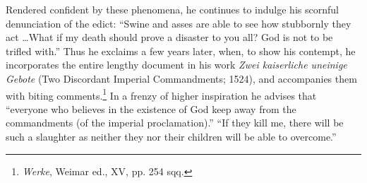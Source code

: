 Rendered confident by these phenomena, he continues to indulge
his scornful denunciation of the edict: “Swine and asses are able to
see how stubbornly they act \dots What if my death should prove
a disaster to you all? God is not to be trifled with.” Thus he exclaims
a few years later, when, to show his contempt, he incorporates the
entire lengthy document in his work \textit{Zwei kaiserliche uneinige Gebote}
(Two Discordant Imperial Commandments; 1524), and accompanies
them with biting comments.\footnote{\textit{Werke}, Weimar ed., XV, pp. 254 sqq.}
In a frenzy of higher inspiration he
advises that “everyone who believes in the existence of God keep
away from the commandments (of the imperial proclamation).” “If
they kill me, there will be such a slaughter as neither they nor their
children will be able to overcome.”
